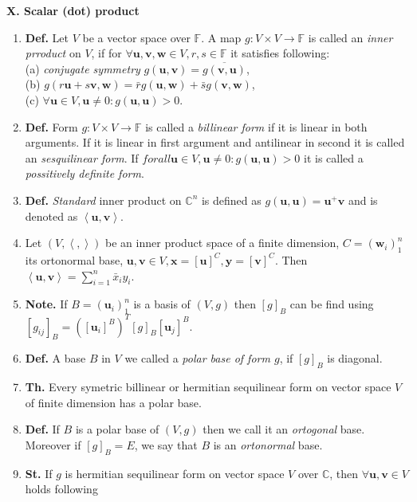 \documentclass{article}
\newcommand{\<}{\left<}
\renewcommand{\>}{\right>}
\newcommand{\C}{\mathbb{C}}
\newcommand{\F}{\mathbb{F}}
\newcommand{\define}{\textbf{Def. }}
\newcommand{\state}{\textbf{St. }}
\newcommand{\theor}{\textbf{Th. }}
\newcommand{\note}{\textbf{Note. }}
\begin{document}
\begin{multicols}{3}
\begin{enumerate}[itemsep=2pt, topsep=2pt, partopsep=2pt, parsep=2pt]
    \end{enumerate}

    \textbf{X. Scalar (dot) product}

    \begin{enumerate}[itemsep=2pt, topsep=2pt, partopsep=2pt, parsep=2pt]

        \item \define Let $V$ be a vector space over $\F$. A map $g:V\times V\to\F$ is called an \emph{inner prroduct} on $V$, if for $\forall\bm u, \bm v, \bm w\in V,r,s\in\F$ it satisfies following:\\(a) \emph{conjugate symmetry} $g(\bm u,\bm v)=\overline{g(\bm v,\bm u)}$,\\(b) $g(r\bm u+s\bm v,\bm w)=\bar{r}g(\bm u,\bm w)+\bar{s}g(\bm v,\bm w)$,\\(c) $\forall\bm u\in V,\bm u\neq 0:g(\bm u,\bm u)>0$.
        \item \define Form $g:V\times V\to\F$ is called a \emph{billinear form} if it is linear in both arguments. If it is linear in first argument and antilinear in second it is called an \emph{sesquilinear form}. If $forall\bm u\in V,\bm u\neq 0:g(\bm u,\bm u)>0$ it is called a \emph{possitively definite form}.
        \item \define \emph{Standard} inner product on $\C^n$ is defined as $g(\bm u,\bm u)=\bm u^+\bm v$ and is denoted as $\<\bm u,\bm v\>$.
        \item Let $(V,\<,\>)$ be an inner product space of a finite dimension, $C=(\bm w_i)_1^n$ its ortonormal base, $\bm u,\bm v\in V,\bm x=[\bm u]^C,\bm y=[\bm v]^C$. Then $\<\bm u,\bm v\>=\sum_{i=1}^n\bar{x}_iy_i$.
        \item \note If $B=\left(\bm u_i\right)_1^n$ is a basis of $(V,g)$ then $[g]_B$ can be find using $[g_{ij}]_B=\left([\bm u_i]^B\right)^T[g]_B[\bm u_j]^B$.
        \item \define A base $B$ in $V$ we called a \emph{polar base of form $g$}, if $[g]_B$ is diagonal.
        \item \theor Every symetric billinear or hermitian sequilinear form on vector space $V$ of finite dimension has a polar base.
        \item \define If $B$ is a polar base of $(V,g)$ then we call it an \emph{ortogonal} base. Moreover if $[g]_B=E$, we say that $B$ is an \emph{ortonormal} base.
        \item \state If $g$ is hermitian sequilinear form on vector space $V$ over $\C$, then $\forall\bm u,\bm v\in V$ holds following\\

\end{enumerate}
\end{multicols}
\end{document}
